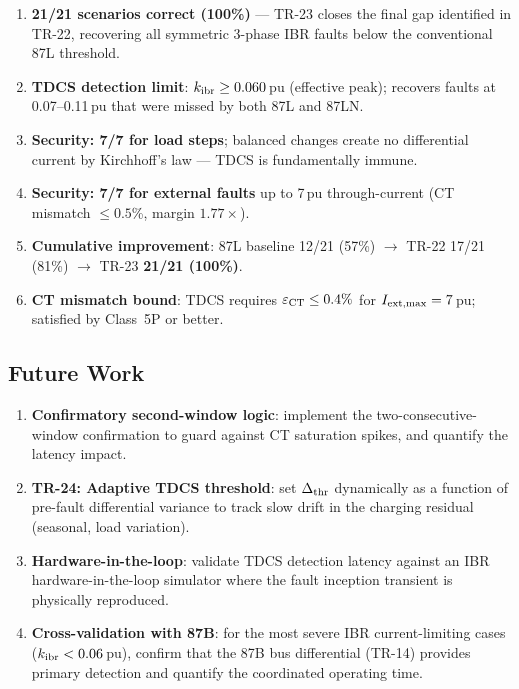 \documentclass[11pt, a4paper]{article}
\begin{document}
\begin{enumerate}
  \item \textbf{21/21 scenarios correct (100\%)} — TR-23 closes the final
        gap identified in TR-22, recovering all symmetric 3-phase IBR
        faults below the conventional 87L threshold.
  \item \textbf{TDCS detection limit}: $k_{\rm ibr} \geq 0.060$\,pu
        (effective peak); recovers faults at 0.07--0.11\,pu that were
        missed by both 87L and 87LN.
  \item \textbf{Security: 7/7 for load steps}; balanced changes create
        no differential current by Kirchhoff's law — TDCS is
        fundamentally immune.
  \item \textbf{Security: 7/7 for external faults} up to 7\,pu
        through-current (CT mismatch $\leq 0.5$\%, margin $1.77\times$).
  \item \textbf{Cumulative improvement}: 87L baseline 12/21 (57\%)
        $\to$ TR-22 17/21 (81\%) $\to$ TR-23 \textbf{21/21 (100\%)}.
  \item \textbf{CT mismatch bound}: TDCS requires $\varepsilon_{\rm CT}
        \leq 0.4\%$ for $I_{\rm ext,max} = 7$\,pu; satisfied by Class~5P
        or better.
\end{enumerate}

\subsection{Future Work}

\begin{enumerate}
  \item \textbf{Confirmatory second-window logic}: implement the
        two-consecutive-window confirmation to guard against CT saturation
        spikes, and quantify the latency impact.
  \item \textbf{TR-24: Adaptive TDCS threshold}: set $\Delta_{\rm thr}$
        dynamically as a function of pre-fault differential variance to
        track slow drift in the charging residual (seasonal, load
        variation).
  \item \textbf{Hardware-in-the-loop}: validate TDCS detection latency
        against an IBR hardware-in-the-loop simulator where the fault
        inception transient is physically reproduced.
  \item \textbf{Cross-validation with 87B}: for the most severe IBR
        current-limiting cases ($k_{\rm ibr} < 0.06$\,pu), confirm that
        the 87B bus differential (TR-14) provides primary detection and
        quantify the coordinated operating time.
\end{enumerate}




\end{document}
